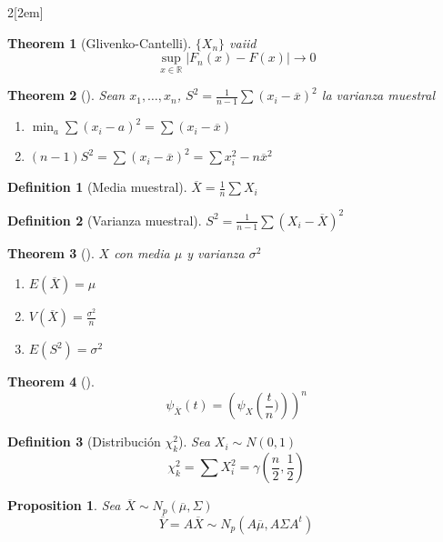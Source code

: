 \documentclass[leqno]{article}
\newtheorem*{theorem}{Theorem}
\newtheorem*{proposition}{Proposition}
\newtheorem*{definition}{Definition}
\begin{document}
\begin{multicols}{2}[\columnsep2em]
\begin{theorem}[Glivenko-Cantelli] $\{X_n\}$ vaiid 
  \[
	\sup_{x\in \mathbb{R}} |F_n(x)-F(x)| \to 0
  \] 
\end{theorem}

\begin{theorem}[]
Sean $x_1, \ldots, x_n$,  $S^2 =\frac{1}{n-1}\sum (x_i-\overline{x}) ^2$ la varianza muestral
\begin{enumerate}[topsep=-6pt, itemsep=0pt]
  \item $\min_a \sum (x_i-a)^2 = \sum (x_i-\overline{x})$ 
  \item $(n-1)S^2 = \sum (x_i-\overline{x})^2 = \sum x_i^2-n\overline{x}^2$
\end{enumerate}
\end{theorem}

\begin{definition}[Media muestral]
$\overline{X} = \frac{1}{n}\sum X_i$
\end{definition}

\begin{definition}[Varianza muestral]
$S^2 = \frac{1}{n-1}\sum (X_i-\overline{X})^2$
\end{definition}

\begin{theorem}[] $X$ con media  $\mu$ y varianza $\sigma ^2$  
\begin{enumerate}[topsep=-6pt, itemsep=0pt]
  \item $E(\overline{X}) = \mu$
  \item $V(\overline{X}) = \frac{\sigma ^2}{n}$ 
  \item $E(S^2)=\sigma ^2$
\end{enumerate}
\end{theorem}

\begin{theorem}[]
\[
  \psi _{\overline{X}}(t) = (\psi_X \left( \frac{t}{n}) \right) )^n
\] 
\end{theorem}

\begin{definition}[Distribución $\chi_k^2$] Sea $X_i \sim N(0,1)$
\[
\chi_k^2 = \sum X_i^2 = \gamma\left(\frac{n}{2}, \frac{1}{2}\right)
\] 
\end{definition}

\begin{proposition} Sea $\overline{X} \sim N_p(\overline{\mu}, \Sigma)$ 
  \[
  \overline{Y} = A\overline{X} \sim N_p(A\overline{\mu}, A\Sigma A^t)
  \] 
\end{proposition}


\end{multicols}
\end{document}
